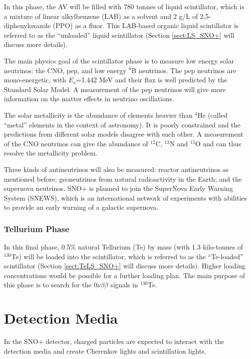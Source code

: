 In this phase, the AV will be filled with 780 tonnes of liquid scintillator, which is a mixture of linear alkylbenzene (LAB) as a solvent and 2 g/L of 2,5-diphenyloxazole (PPO) as a fluor. This LAB-based organic liquid scintillator is referred to as the ``unloaded'' liquid scintillator (Section \ref{sect:LS_SNO+} will discuss more details).

The main physics goal of the scintillator phase is to measure low energy solar neutrinos: the CNO, pep, and low energy $^8$B neutrinos. The pep neutrinos are mono-energetic, with $E_\nu$=1.442 MeV and their flux is well predicted by the Standard Solar Model\cite{davini2016cno}. A measurement of the pep neutrinos will give more information on the matter effects in neutrino oscillations. 

The solar metallicity is the abundance of elements heavier than $^4$He (called ``metal'' elements in the context of astronomy). It is poorly constrained and the predictions from different solar models disagree with each other. A measurement of the CNO neutrinos can give the abundance of $^{12}$C, $^{13}$N and $^{15}$O and can thus resolve the metallicity problem\cite{cerdeno2018cno}.

Three kinds of antineutrinos will also be measured: reactor antineutrinos as mentioned before; geoneutrinos from natural radioactivity in the Earth; and the supernova neutrinos. SNO+ is planned to join the SuperNova Early Warning System (SNEWS), which is an international network of experiments with abilities to provide an early warning of a galactic supernova\cite{snop_jinst}.

\subsubsection{Tellurium Phase}
In this final phase, 0.5\% natural Tellurium (Te) by mass (with 1.3 kilo-tonnes of $^{130}$Te) will be loaded into the scintillator, which is referred to as the ``Te-loaded'' scintillator (Section \ref{sect:TeLS_SNO+} will discuss more details). Higher loading concentrations would be possible for a further loading plan\cite{Paton:2019kgy}. The main purpose of this phase is to search for the $0\nu\beta\beta$ signals in $^{130}$Te.

\section{Detection Media}
In the SNO+ detector, charged particles are expected to interact with the detection media and create Cherenkov lights and scintillation lights. 

